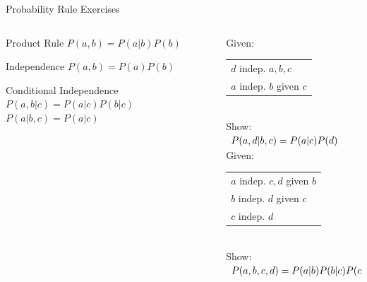 \documentclass[14pt]{beamer}
\begin{document}
\begin{frame}{Probability Rule Exercises}
	\begin{columns}
		\begin{column}{2in}
			\begin{block}{Product Rule}
				$P(a,b) = P(a|b)P(b)$
			\end{block}
			\begin{block}{Independence}
				$P(a,b) = P(a)P(b)$
			\end{block}
			\begin{block}{Conditional Independence}
				$P(a,b|c) = P(a|c)P(b|c)$ \\
				$P(a|b,c) = P(a|c)$ \\
			\end{block}
		\end{column}
		\begin{column}{2.4in}
			\small
			Given: \\
			\begin{tabular}[t]{l}
				$d$ indep. $a,b,c$ \\
				$a$ indep. $b$ given $c$
			\end{tabular}
			\\ \smallskip
			Show:
			\\ \smallskip
			$
			\begin{array}{l@{}}
				P(a,d|b,c) = P(a|c)P(d)
			\end{array}
			$
			\\ \bigskip
			Given: \\
			\begin{tabular}[t]{l}
				$a$ indep. $c,d$ given $b$ \\
				$b$ indep. $d$ given $c$ \\
				$c$ indep. $d$
			\end{tabular}
			\\ \smallskip
			Show:
			\\ \smallskip
			\footnotesize
			$
			\begin{array}{l@{}}
				P(a,b,c,d) = P(a|b)P(b|c)P(c)P(d)
			\end{array}
			$
		\end{column}
	\end{columns}
\end{frame}
\end{document}
